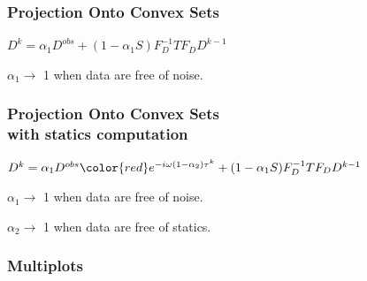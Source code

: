 
\begin{frame} \frametitle{Projection Onto Convex Sets}
    \Large{$D^{k} = \alpha_1 D^{obs} + (1-\alpha_1 S)F_{D}^{-1}TF_{D}D^{k-1}$}

\bigskip

\bigskip
$\alpha_1 \rightarrow$ 1  when data are free of noise.
\end{frame}

\begin{frame} \frametitle{Projection Onto Convex Sets\\ {\color{red}with statics computation}}
    \Large{$D^{k} = \alpha_1 D^{obs}{\color{red}e^{-i\omega(1-\alpha_2)\tau^k}} + (1-\alpha_1 S)F_{D}^{-1}TF_{D}D^{k-1}$}

\bigskip

\bigskip
$\alpha_1 \rightarrow$ 1  when data are free of noise.
{\color{red}

$\alpha_2 \rightarrow$ 1  when data are free of statics.}
\end{frame}


\begin{frame} \frametitle{Multiplots}
\end{frame}

%
%


